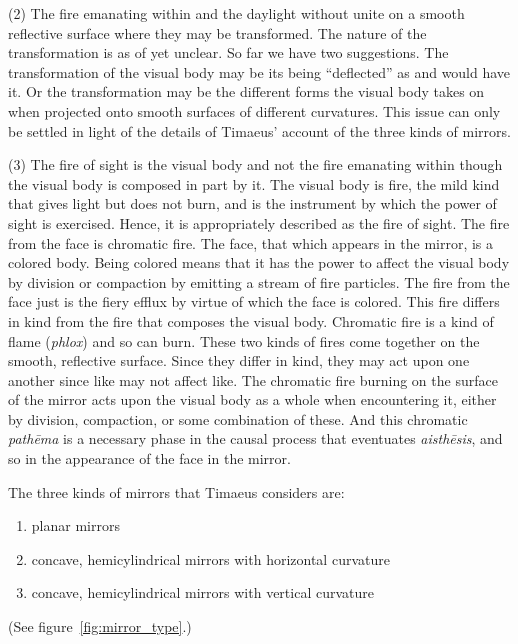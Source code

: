 (2) The fire emanating within and the daylight without unite on a smooth reflective surface where they may be transformed. The nature of the transformation is as of yet unclear. So far we have two suggestions. The transformation of the visual body may be its being ``deflected'' as \citet[159]{Archer-Hind:1888qd} and \citet[103]{Bury:1929jb} would have it. Or the transformation may be the different forms the visual body takes on when projected onto smooth surfaces of different curvatures. This issue can only be settled in light of the details of Timaeus' account of the three kinds of mirrors.

(3) The fire of sight is the visual body and not the fire emanating within though the visual body is composed in part by it. The visual body is fire, the mild kind that gives light but does not burn, and is the instrument by which the power of sight is exercised. Hence, it is appropriately described as the fire of sight. The fire from the face is chromatic fire. The face, that which appears in the mirror, is a colored body. Being colored means that it has the power to affect the visual body by division or compaction by emitting a stream of fire particles. The fire from the face just is the fiery efflux by virtue of which the face is colored. This fire differs in kind from the fire that composes the visual body. Chromatic fire is a kind of flame (\emph{phlox}) and so can burn. These two kinds of fires come together on the smooth, reflective surface. Since they differ in kind, they may act upon one another since like may not affect like. The chromatic fire burning on the surface of the mirror acts upon the visual body as a whole when encountering it, either by division, compaction, or some combination of these. And this chromatic \emph{pathēma} is a necessary phase in the causal process that eventuates \emph{aisthēsis}, and so in the appearance of the face in the mirror.

The three kinds of mirrors that Timaeus considers are:
\begin{enumerate}[(1)]
	\item planar mirrors
	\item concave, hemicylindrical mirrors with horizontal curvature
	\item concave, hemicylindrical mirrors with vertical curvature
\end{enumerate}
(See figure~\ref{fig:mirror_type}.)

